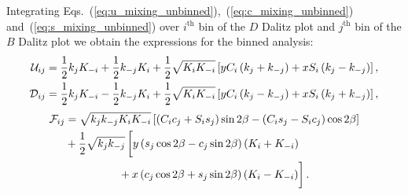 \documentclass[a4paper,11pt]{article}
\begin{document}
Integrating Eqs.~(\ref{eq:u_mixing_unbinned}),~(\ref{eq:c_mixing_unbinned}) 
and~(\ref{eq:s_mixing_unbinned}) over $i^{\mathrm{th}}$ bin of the $D$ Dalitz 
plot and $j^{\mathrm{th}}$ bin of the $B$ Dalitz plot we obtain the expressions for
the binned analysis:
\begin{subequations}\label{eq:uc_mixing}
 \begin{align}
  \label{eq:u_mixing}
  \mathcal{U}_{ij} &= \frac{1}{2}k_jK_{-i} + \frac{1}{2}k_{-j}K_i
              + \frac{1}{2}\sqrt{K_iK_{-i}}
              \left[yC_i\left( k_j + k_{-j} \right) + xS_i\left( k_j - k_{-j} \right)\right], \\ 
  \label{eq:c_mixing}
  \mathcal{D}_{ij} &= \frac{1}{2}k_jK_{-i} - \frac{1}{2}k_{-j}K_i
              + \frac{1}{2}\sqrt{K_iK_{-i}}
              \left[yC_i\left( k_j - k_{-j} \right) + xS_i\left( k_j + k_{-j} \right)\right],
 \end{align}
\end{subequations}
\begin{equation}\label{eq:s_mixing}
 \begin{split}
  \scoef_{ij} &= \sqrt{\kj\kmj\ki\kmi}\left[\lbr \ci\cj+\si\sj \rbr\sindbeta - 
                                            \lbr \ci\sj-\si\cj \rbr\cosdbeta\right] \\
              &+ \frac{1}{2}\sqrt{\kj\kmj}\left[
               y\lbr \sj\cosdbeta - 
                     \cj\sindbeta \rbr
                     \lbr \ki + \kmi \rbr \phantom{\frac{1}{2}} \right.\\
              &\left.\phantom{\frac{1}{2}\sqrt{\kj\kmj}}\ 
              + x\lbr \cj\cosdbeta + 
                      \sj\sindbeta \rbr \lbr \ki - \kmi \rbr
              \right].
 \end{split}
\end{equation}
\end{document}
